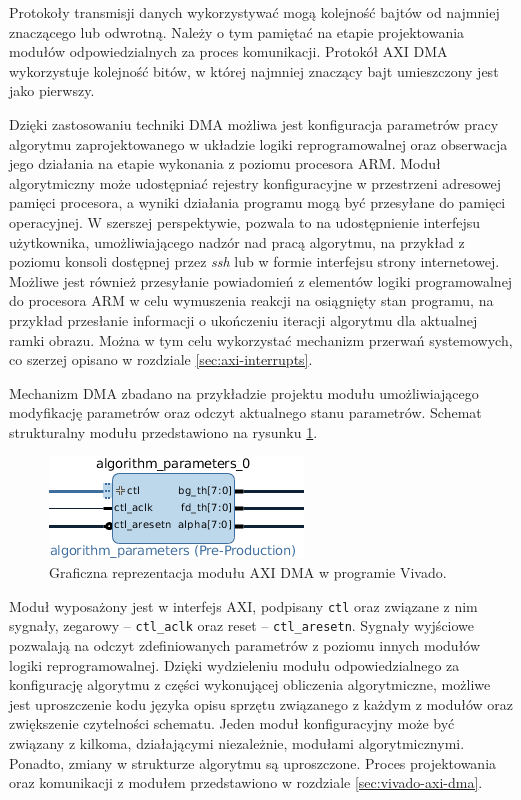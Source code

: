 Protokoły transmisji danych wykorzystywać mogą kolejność bajtów od najmniej znaczącego lub odwrotną. Należy o tym pamiętać na etapie projektowania modułów odpowiedzialnych za proces komunikacji. Protokół AXI DMA wykorzystuje kolejność bitów, w której najmniej znaczący bajt umieszczony jest jako pierwszy. 

Dzięki zastosowaniu techniki DMA możliwa jest konfiguracja parametrów pracy algorytmu zaprojektowanego w układzie logiki reprogramowalnej oraz obserwacja jego działania na etapie wykonania z poziomu procesora ARM. Moduł algorytmiczny może udostępniać rejestry konfiguracyjne w przestrzeni adresowej pamięci procesora, a wyniki działania programu mogą być przesyłane do pamięci operacyjnej.
W szerszej perspektywie, pozwala to na udostępnienie interfejsu użytkownika, umożliwiającego nadzór nad pracą algorytmu, na przykład z poziomu konsoli dostępnej przez \emph{ssh} lub w formie interfejsu strony internetowej. 
Możliwe jest również przesyłanie powiadomień z elementów logiki programowalnej do procesora ARM w celu wymuszenia reakcji na osiągnięty stan programu, na przykład przesłanie informacji o ukończeniu iteracji algorytmu dla aktualnej ramki obrazu. 
Można w tym celu wykorzystać mechanizm przerwań systemowych, co szerzej opisano w rozdziale \ref{sec:axi-interrupts}.

Mechanizm DMA zbadano na przykładzie projektu modułu umożliwiającego modyfikację parametrów oraz odczyt aktualnego stanu parametrów. 
Schemat strukturalny modułu przedstawiono na rysunku \ref{fig:axi-dma-diagram}.

\begin{figure}[h]
	\centering
	\includegraphics[]{img/algorithm-parameters.png}
	\caption{Graficzna reprezentacja modułu AXI DMA w programie Vivado.}
	\label{fig:axi-dma-diagram}
\end{figure}

Moduł wyposażony jest w interfejs AXI, podpisany \texttt{ctl} oraz związane z nim sygnały, zegarowy -- \texttt{ctl\_aclk} oraz reset -- \texttt{ctl\_aresetn}. 
Sygnały wyjściowe pozwalają na odczyt zdefiniowanych parametrów z poziomu innych modułów logiki reprogramowalnej. 
Dzięki wydzieleniu modułu odpowiedzialnego za konfigurację algorytmu z części wykonującej obliczenia algorytmiczne, możliwe jest uproszczenie kodu języka opisu sprzętu związanego z każdym z modułów oraz zwiększenie czytelności schematu. 
Jeden moduł konfiguracyjny może być związany z kilkoma, działającymi niezależnie, modułami algorytmicznymi. 
Ponadto, zmiany w strukturze algorytmu są uproszczone.
Proces projektowania oraz komunikacji z modułem przedstawiono w rozdziale \ref{sec:vivado-axi-dma}. 



